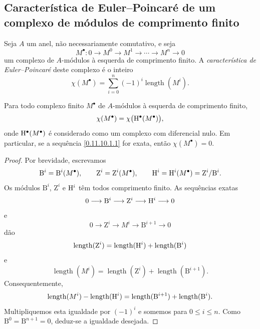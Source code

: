 \subsection{Característica de Euler--Poincar\'e de um complexo de módulos de comprimento finito}
\label{subsection:0.11.10}

\begin{env}[11.10.1]
\label{0.11.10.1}
Seja $A$ um anel, não necessariamente comutativo, e seja
\[
  M^\bullet:
  0\longrightarrow M^0\longrightarrow M^1
  \longrightarrow\cdots\longrightarrow M^n\longrightarrow 0
  \tag{11.10.1.1}\label{0.11.10.1.1}
\]
um complexo de $A$-módulos à esquerda de comprimento finito.
A \emph{característica de Euler--Poincar\'e} deste complexo é o
inteiro
\[
  \chi(M^\bullet)
  =
  \sum_{i=0}^{n}(-1)^i\operatorname{length}(M^i).
  \tag{11.10.1.2}\label{0.11.10.1.2}
\]
\end{env}

\begin{proposition}[11.10.2]
\label{0.11.10.2}
Para todo complexo finito $M^\bullet$ de $A$-módulos à esquerda de comprimento
finito,
\[
  \chi(M^\bullet)=\chi\bigl(\mathrm{H}^\bullet(M^\bullet)\bigr),
\]
onde $\mathrm{H}^\bullet(M^\bullet)$ é considerado como um complexo com diferencial
nulo.
Em particular, se a sequência \eqref{0.11.10.1.1} for exata, então
$\chi(M^\bullet)=0$.
\end{proposition}

\begin{proof}
Por brevidade, escrevamos
\[
  \mathrm{B}^i=\mathrm{B}^i(M^\bullet),
  \qquad
  \mathrm{Z}^i=\mathrm{Z}^i(M^\bullet),
  \qquad
  \mathrm{H}^i=\mathrm{H}^i(M^\bullet)=\mathrm{Z}^i/\mathrm{B}^i.
\]
Os módulos $\mathrm{B}^i$, $\mathrm{Z}^i$ e $\mathrm{H}^i$ têm todos
comprimento finito.
As sequências exatas
\[
  0\longrightarrow\mathrm{B}^i
  \longrightarrow\mathrm{Z}^i
  \longrightarrow\mathrm{H}^i
  \longrightarrow0
\]
e
\[
  0\longrightarrow\mathrm{Z}^i
  \longrightarrow M^i
  \longrightarrow\mathrm{B}^{i+1}
  \longrightarrow0
\]
dão
\[
  \operatorname{length}(\mathrm{Z}^i)
  =
  \operatorname{length}(\mathrm{H}^i)
  +
  \operatorname{length}(\mathrm{B}^i)
\]
e
\[
  \operatorname{length}(M^i)
  =
  \operatorname{length}(\mathrm{Z}^i)
  +
  \operatorname{length}(\mathrm{B}^{i+1}).
\]
Consequentemente,
\[
  \operatorname{length}(M^i)-\operatorname{length}(\mathrm{H}^i)
  =
  \operatorname{length}(\mathrm{B}^{i+1})
  +
  \operatorname{length}(\mathrm{B}^i).
\]
Multipliquemos esta igualdade por $(-1)^i$ e somemos para $0\leq i\leq n$.
Como $\mathrm{B}^0=\mathrm{B}^{n+1}=0$, deduz-se a igualdade desejada.
\end{proof}

